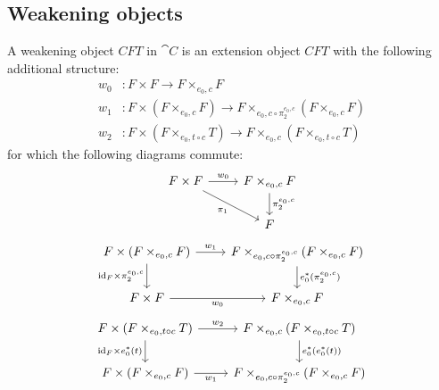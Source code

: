 \subsection{Weakening objects}
\begin{defn}
A weakening object $CFT$ in $\cat{C}$ is an extension object $CFT$ with the
following additional structure:
\begin{align*}
w_0 & : F\times F\to F\times_{e_0,c} F\\
w_1 & : F\times(F\times_{e_0,c} F) \to F\times_{e_0,c \circ \pi_2^{e_0,c}} (F\times_{e_0,c}F)\\
w_2 & : F\times(F\times_{e_0,t\circ c} T) \to F\times_{e_0,c}(F\times_{e_0,t\circ c} T)
\end{align*}
for which the following diagrams commute:
\begin{equation*}
\begin{tikzcd}
F\times F \ar{r}{w_0} \ar{dr}[swap]{\pi_1} & F\times_{e_0,c}F \ar{d}{\pi_2^{e_0,c}}\\
& F
\end{tikzcd}
\end{equation*}
\begin{equation*}
\begin{tikzcd}
F\times(F\times_{e_0,c} F) 
  \ar{d}[swap]{\catid{F}\times \pi_2^{e_0,c}}
  \ar{r}{w_1}
  &
F\times_{e_0,c\circ \pi_2^{e_0,c}} (F\times_{e_0,c}F)
  \ar{d}{e_0^\ast(\pi_2^{e_0,c})}
  \\
F\times F
  \ar{r}[swap]{w_0}
  &
F\times_{e_0,c} F
\end{tikzcd}
\end{equation*}
\begin{equation*}
\begin{tikzcd}
F\times(F\times_{e_0,t\circ c} T)
  \ar{r}{w_2}
  \ar{d}[swap]{\catid{F}\times e_0^\ast(t)}
  &
F\times_{e_0,c}(F\times_{e_0,t\circ c} T)
  \ar{d}{e_0^\ast(e_0^\ast(t))}
  \\
F\times(F\times_{e_0,c} F)
  \ar{r}[swap]{w_1}
  &
F\times_{e_0,c\circ \pi_2^{e_0,c}} (F\times_{e_0,c}F)
\end{tikzcd}
\end{equation*}
\end{defn}
